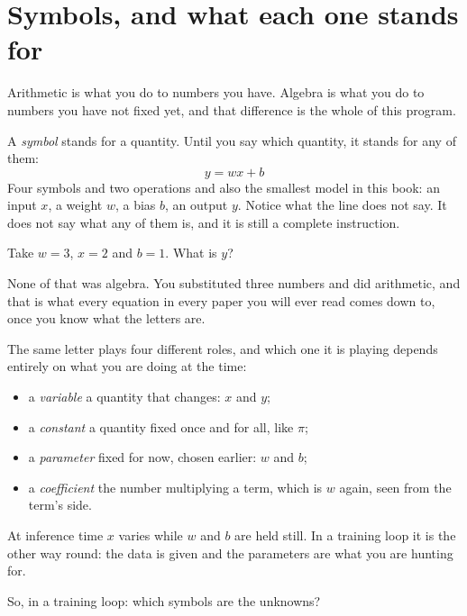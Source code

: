 \section{Symbols, and what each one stands for}
\label{sec:F02-symbols}

\begin{fr}
Arithmetic is what you do to numbers you have. Algebra is what you do to
numbers you have not fixed yet, and that difference is the whole of this
program.

A \emph{symbol} stands for a quantity. Until you say which quantity, it stands
for any of them:
\[ y = wx + b \]
Four symbols and two operations \dash{} and also the smallest model in this
book: an input $x$, a weight $w$, a bias $b$, an output $y$. Notice what the
line does not say. It does not say what any of them is, and it is still a
complete instruction.

Take $w = 3$, $x = 2$ and $b = 1$. What is $y$?
\nextframe
\end{fr}

\begin{fr}
None of that was algebra. You substituted three numbers and did arithmetic,
and that is what every equation in every paper you will ever read comes down
to, once you know what the letters are.

The same letter plays four different roles, and which one it is playing depends
entirely on what you are doing at the time:

\begin{itemize}
\item a \emph{variable} \dash{} a quantity that changes: $x$ and $y$;
\item a \emph{constant} \dash{} a quantity fixed once and for all, like $\pi$;
\item a \emph{parameter} \dash{} fixed for now, chosen earlier: $w$ and $b$;
\item a \emph{coefficient} \dash{} the number multiplying a term, which is $w$
  again, seen from the term's side.
\end{itemize}

At inference time $x$ varies while $w$ and $b$ are held still. In a training
loop it is the other way round: the data is given and the parameters are what
you are hunting for.

So, in a training loop: which symbols are the unknowns?
\nextframe
\end{fr}

